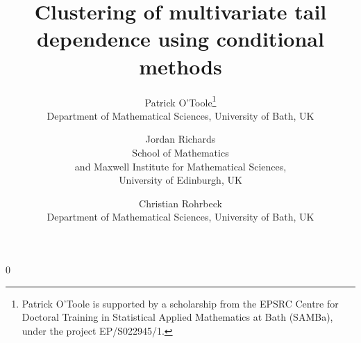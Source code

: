 \documentclass[12pt]{article}
\newcommand{\blind}{0}
\begin{document}
%

\def\spacingset#1{%
  \renewcommand{\baselinestretch}{#1}\small\normalsize
}

\spacingset{1}



\blind
{
  \title{\bf Clustering of multivariate tail dependence using conditional methods}
  \author{%
  Patrick O'Toole\thanks{Patrick O'Toole is supported by a scholarship from the EPSRC Centre for Doctoral Training in Statistical Applied Mathematics at Bath (SAMBa), under the project EP/S022945/1.}\\
  Department of Mathematical Sciences, University of Bath, UK
  \and
  Jordan Richards\\
  School of Mathematics \\
  and Maxwell Institute for Mathematical Sciences, \\
  University of Edinburgh, UK
  \and
  Christian Rohrbeck\\
  Department of Mathematical Sciences, University of Bath, UK
  }
  \maketitle
} \fi
\end{document}
